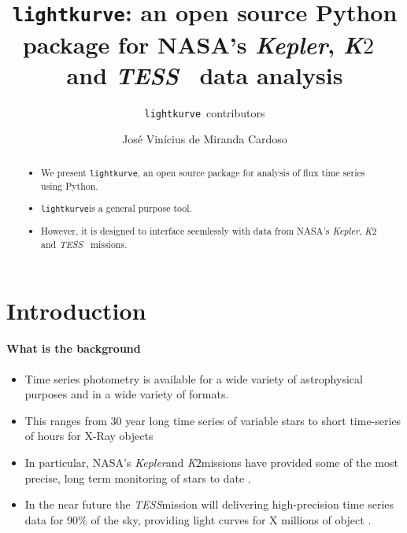 \documentclass[twocolumn]{aastex62}
\newcommand{\ktwo}{{\it K$\mathit{2}$}}
\newcommand{\tess}{{\it TESS}}
\newcommand{\kepler}{{\it Kepler}}
\newcommand{\lightkurve}{\texttt{lightkurve}}
\begin{document}
\title{\lightkurve: an open source Python package for NASA's \kepler, \ktwo~ and \tess~ data analysis}


\author{\lightkurve~contributors}

\author{Jos\'e Vin\'icius de Miranda Cardoso}

\begin{abstract}

  \begin{itemize}
  \item{We present \lightkurve, an open source package for analysis of flux time series using Python.}
  \item{\lightkurve is a general purpose tool.}
  \item{However, it is designed to interface seemlessly with data from NASA's \kepler, \ktwo~ and \tess~ missions.}
  \end{itemize}

\end{abstract}

\keywords{}

\section{Introduction} \label{sec:intro}

\paragraph{What is the background}
\begin{itemize}
\item{Time series photometry is available for a wide variety of astrophysical purposes and in a wide variety of formats.}
\item{This ranges from 30 year long time series of variable stars\cite{citationneeded} to short time-series of hours for X-Ray objects \cite{citationneeded}}
\item{In particular, NASA's \kepler and \ktwo missions have provided some of the most precise, long term monitoring of stars to date \cite{citationneeded}.}
\item{In the near future the \tess mission will delivering high-precision time series data for 90\% of the sky, providing light curves for X millions of object \cite{citationneeded}.}
\end{itemize}
\end{document}
